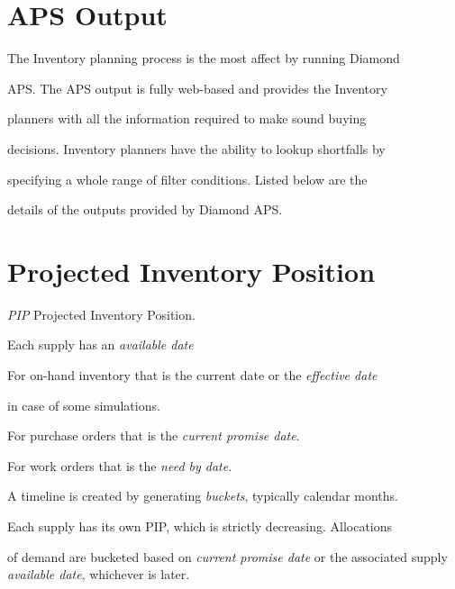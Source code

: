 \documentclass[letterpaper,10pt,english]{sphinxmanual}
\begin{document}
\section{APS Output}
\label{APS/APS-Features-and-Benefits:aps-output}
\begin{DUlineblock}{0em}
\item[] The Inventory planning process is the most affect by running Diamond
\item[] APS. The APS output is fully web-based and provides the Inventory
\item[] planners with all the information required to make sound buying
\item[] decisions. Inventory planners have the ability to lookup shortfalls by
\item[] specifying a whole range of filter conditions. Listed below are the
\item[] details of the outputs provided by Diamond APS.
\end{DUlineblock}


\section{Projected Inventory Position}
\label{APS/APS-Features-and-Benefits:projected-inventory-position}
\emph{PIP} Projected Inventory Position.

Each supply has an \emph{available date}

\begin{DUlineblock}{0em}
\item[] For on-hand inventory that is the current date or the \emph{effective date}
\end{DUlineblock}

in case of some
\textbar{} simulations.

For purchase orders that is the \emph{current promise date}.

For work orders that is the \emph{need by date}.

A timeline is created by generating \emph{buckets}, typically calendar
months.

\begin{DUlineblock}{0em}
\item[] Each supply has its own PIP, which is strictly decreasing. Allocations
\end{DUlineblock}

of demand are bucketed based on \emph{current promise date}
\textbar{} or the associated supply \emph{available date}, whichever is later.
\end{document}
